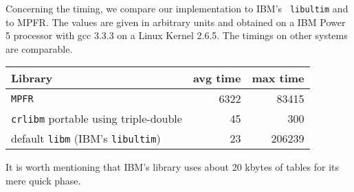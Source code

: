 Concerning the timing, we compare our implementation to IBM's {\tt
  libultim} and to MPFR. The values are given in arbitrary units and
obtained on a IBM Power 5 processor with gcc 3.3.3 on a Linux Kernel
2.6.5. The timings on other systems are comparable.
\begin{center}
\begin{tabular}{|l|r|r|}
 \hline
  Library                       &     avg time  & max time \\
 \hline
 \hline
 \texttt{MPFR}   &   6322    & 83415        \\ 
 \hline
 \texttt{crlibm} portable using triple-double      &        45    & 300        \\ 
 \hline
 default \texttt{libm} (IBM's {\tt libultim})  &        23    & 206239      \\ 
 \hline
\end{tabular}
\end{center}
It is worth mentioning that IBM's library uses about 20 kbytes of
tables for its mere quick phase.

